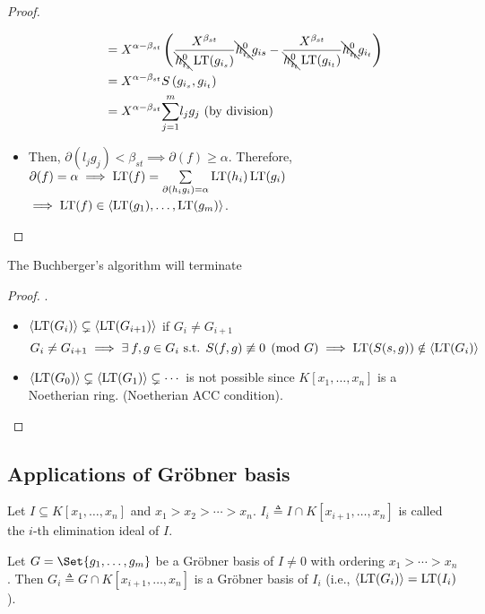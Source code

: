 \begin{theorem}
\begin{proof}
\begin{itemize}
\[\begin{split}
              &= X^{\alpha-\beta_{st}} \left( \frac{X^{\beta_{st}}}{\bcancel{h_{i_s}^0}\operatorname{LT}(g_{i_s})}\bcancel{h_{i_s}^0}g_{is} - \frac{X^{\beta_{st}}}{\bcancel{h_{i_t}^0}\operatorname{LT}(g_{i_t})}\bcancel{h_{i_t}^0}g_{i_t}  \right) \\
              &= X^{\alpha-\beta_{st}} S\left(g_{i_s},g_{i_t}\right) \\
              &= X^{\alpha-\beta_{st}}\overset{m}{\underset{j = 1}{\sum}}{l_jg_j} \text{ (by division)}
            \end{split}
          \]
      \item Then, $\partial(l_jg_j) < \beta_{st} \implies \partial(f) \geq \alpha$.
        Therefore, $\partial(f) = \alpha \implies \operatorname{LT}(f) =
        \sum\limits_{\partial(h_ig_i) = \alpha} \operatorname{LT}(h_i)\operatorname{LT}(g_i)$
        $\implies \operatorname{LT}(f) \in \langle \operatorname{LT}(g_1),\dots, \operatorname{LT}(g_m) \rangle$.
    \end{itemize}
  \end{proof}
\end{theorem}

\begin{theorem}
  The Buchberger's algorithm will terminate
  \begin{proof}
    $.$
    \begin{itemize}
      \item $\langle \operatorname{LT}(G_i) \rangle \subsetneq \langle \operatorname{LT}(G_{i+1}) \rangle$ if $G_i \neq G_{i+1}$
        \[
          G_i \neq G_{i+1} \implies \exists f, g \in G_i \text{ s.t. } S(f,g)
          \not\equiv 0 \pmod G \implies \LT(S(s,g)) \notin \gen{\LT(G_i)}
        \]
      \item $\langle \operatorname{LT}(G_0) \rangle \subsetneq \langle \operatorname{LT}(G_1) \rangle \subsetneq \dotsm$
        is not possible since $K[x_1, \dots, x_n]$ is a Noetherian ring.
        (Noetherian ACC condition).
    \end{itemize}
  \end{proof}
\end{theorem}

\subsection{Applications of Gr\"{o}bner basis}
\begin{definition}
  Let $I \subseteq K[x_1, \dots, x_n]$ and $x_1 > x_2 > \dotsm > x_n$.
  $I_i \triangleq I \cap K[x_{i+1}, \dots, x_n]$ is called the $i$-th elimination
  ideal of $I$.
\end{definition}

\begin{theorem}
  Let $G = \Set{g_1, \dots, g_m}$ be a Gr\"obner basis of $I \neq 0$ with ordering
  $x_1 > \dotsm > x_n$. Then $G_i \triangleq G \cap K[x_{i+1}, \dots, x_n]$
  is a Gr\"obner basis of $I_i$ (i.e., $\langle \operatorname{LT}(G_i) \rangle = \operatorname{LT}(I_i)$).
\end{theorem}

